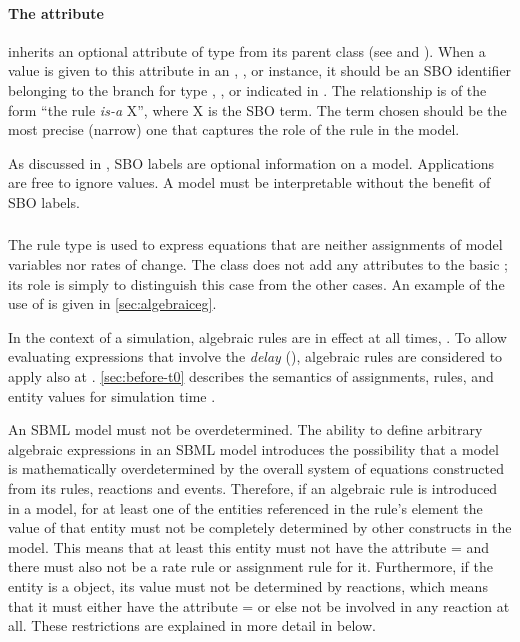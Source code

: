 \paragraph{The  attribute}

\Rule inherits an optional 
attribute of type  from its parent
class \SBase (see 
and ).  When a value is given to this
attribute in an \AlgebraicRule, \AssignmentRule, or
\RateRule instance, it should be an
SBO identifier belonging to the branch for type  \AlgebraicRule, \AssignmentRule, or
\RateRule indicated in .  The relationship is
of the form ``the rule \emph{is-a} X'', where X is
the SBO term.  The term chosen should be the most precise (narrow)
one that captures the role of the rule in the model.

As discussed in , SBO labels are optional
information on a model.  Applications are free to ignore
 values.  A model must be interpretable without the
benefit of SBO labels.


\subsubsection{}
\label{sec:algebraicrule}

The rule type \AlgebraicRule is used to express equations that are
neither assignments of model variables nor rates of change.  The
\AlgebraicRule class does not add any attributes to the basic
\Rule; its role is simply to distinguish this case from the other
cases.  An example of the use of \AlgebraicRule is given in
\ref{sec:algebraiceg}.

In the context of a simulation, algebraic rules are in effect at
all times, .  To allow evaluating expressions that
involve the \emph{delay} 
(), algebraic rules are considered
to apply also at .  \ref{sec:before-t0}
describes the semantics of assignments, rules, and entity values
for simulation time .

An SBML model must not be overdetermined.  The ability to define
arbitrary algebraic expressions in an SBML model introduces the
possibility that a model is mathematically overdetermined by the
overall system of equations constructed from its rules, reactions
and events.  Therefore, if an algebraic rule is introduced in a
model, for at least one of the entities referenced in the rule's
 element the value of that entity must not be
completely determined by other constructs in the model.  This
means that at least this entity must not have the attribute
= and there must also not be a rate rule
or assignment rule for it.  Furthermore, if the entity is a
\Species object, its value must not be determined by reactions,
which means that it must either have the attribute
= or else not be involved in
any reaction at all.  These restrictions are explained in more
detail in  below.

